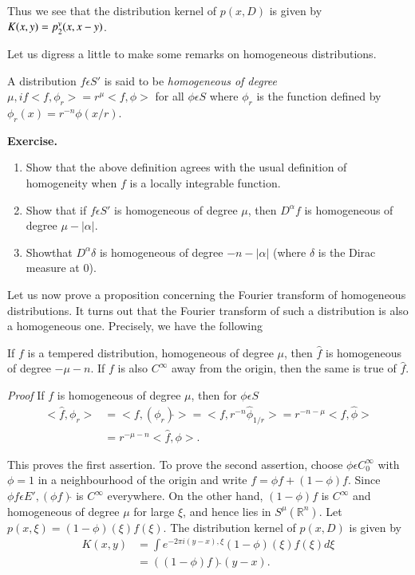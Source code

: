 Thus  we see that the distribution kernel of $p(x,D)$ is given by $K
(x, y)\break = p^v_{2} (x, x-y)$. 

Let us digress a little to make some remarks  on homogeneous distributions.

\begin{defi}%
  A distribution  $f \epsilon S'$ is said to be {\em homogeneous of
  degree} $ \mu,  if < f,  \phi _r > = r^ \mu < f, \phi > $  for all
$\phi \epsilon S$ where $\phi _r$   is the function defined by
$\phi _r (x) = r^{-n}   \phi (x/r)$. 
\end{defi}

\noindent \textbf{Exercise.}
  \begin{enumerate}
  \item Show that the above definition agrees with the usual definition
    of homogeneity  when $f$ is a locally integrable function. 
  \item Show that if $f \epsilon S'$  is homogeneous of degree $\mu
    $, then $D^\alpha f$ is homogeneous of degree $\mu - | \alpha|$. 
  \item Show\pageoriginale that $D^\alpha \delta $ is homogeneous of degree $-n- |
    \alpha |$  (where $\delta$ is the Dirac measure at 0). 
  \end{enumerate}

Let us now prove a proposition concerning the Fourier transform of
homogeneous distributions. It turns out that the Fourier transform of
such a distribution is also  a homogeneous one. Precisely, we have the
following 

\setcounter{prop}{1}
\begin{prop}\label{chap5:prop5.2}%
  If $f$ is a tempered distribution, homogeneous of degree $\mu$,
  then $\hat{f}$  is homogeneous of degree $-\mu -n$. If $f$ is also
  $C^ \infty$ away from the origin,  then the same is true  of
  $\hat{f}$. 
\end{prop}

\noindent \textit{Proof}
  If $f$ is homogeneous of degree $\mu$, then for $\phi \epsilon S$ 	
  \begin{align*}
    < \hat{f}, \phi_r > &= <f, ( \phi _r ) \hat { } > = < f, r ^{-n}
    \hat{\phi}_{1/r}> = r^{-n- \mu }  <  f, \hat{\phi}>\\ 
    & = r^{- \mu -n }< \hat{f},  \phi >.\tag*{$\Box$}
  \end{align*}

 This proves the first assertion. To prove the second assertion,
 choose $\phi \epsilon C^\infty_0 $ with $\phi = 1$ in a
 neighbourhood of the origin and write $ f= \phi f + (1- \phi )f$.
 Since $ \phi f \epsilon E ', ( \phi f) \hat { } $ is $ C^\infty $
 everywhere. On the other  hand,  $(1 - \phi )f$ is $C^\infty$ and
 homogeneous of degree $\mu$ for large  $\xi$,  and hence lies in $S^
 \mu ( \mathbb{R}^n)$. Let $p(x, \xi ) = (1 - \phi ) ( \xi ) f ( \xi
 )$. The distribution kernel of $p(x,D)$ is given by  
 \begin{align*}
   K(x,y) &= \int e^{-2 \pi i (y-x),\xi} (1 - \phi ) ( \xi ) f  ( \xi) d\xi\\
   &= ((1 - \phi ) f)\hat { } (y-x).
 \end{align*} 
 
